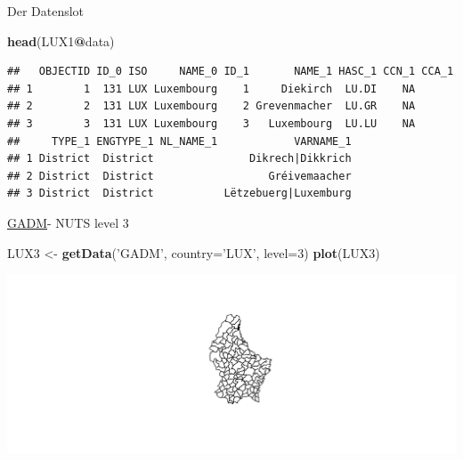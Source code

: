 \documentclass[ignorenonframetext,]{beamer}
\newenvironment{Shaded}{\begin{snugshade}}{\end{snugshade}}
\newcommand{\KeywordTok}[1]{\textcolor[rgb]{0.13,0.29,0.53}{\textbf{#1}}}
\newcommand{\DataTypeTok}[1]{\textcolor[rgb]{0.13,0.29,0.53}{#1}}
\newcommand{\DecValTok}[1]{\textcolor[rgb]{0.00,0.00,0.81}{#1}}
\newcommand{\StringTok}[1]{\textcolor[rgb]{0.31,0.60,0.02}{#1}}
\newcommand{\OperatorTok}[1]{\textcolor[rgb]{0.81,0.36,0.00}{\textbf{#1}}}
\newcommand{\NormalTok}[1]{#1}
\begin{document}
\begin{frame}[fragile]{Der Datenslot}

\begin{Shaded}
\begin{Highlighting}[]
\KeywordTok{head}\NormalTok{(LUX1}\OperatorTok{@}\NormalTok{data)}
\end{Highlighting}
\end{Shaded}

\begin{verbatim}
##   OBJECTID ID_0 ISO     NAME_0 ID_1       NAME_1 HASC_1 CCN_1 CCA_1
## 1        1  131 LUX Luxembourg    1     Diekirch  LU.DI    NA      
## 2        2  131 LUX Luxembourg    2 Grevenmacher  LU.GR    NA      
## 3        3  131 LUX Luxembourg    3   Luxembourg  LU.LU    NA      
##     TYPE_1 ENGTYPE_1 NL_NAME_1            VARNAME_1
## 1 District  District               Dikrech|Dikkrich
## 2 District  District                  Gréivemaacher
## 3 District  District           Lëtzebuerg|Luxemburg
\end{verbatim}

\end{frame}

\begin{frame}[fragile]{\href{http://www.gadm.org/}{GADM}- NUTS level 3}

\begin{Shaded}
\begin{Highlighting}[]
\NormalTok{LUX3 <-}\StringTok{ }\KeywordTok{getData}\NormalTok{(}\StringTok{'GADM'}\NormalTok{, }\DataTypeTok{country=}\StringTok{'LUX'}\NormalTok{, }\DataTypeTok{level=}\DecValTok{3}\NormalTok{)}
\KeywordTok{plot}\NormalTok{(LUX3)}
\end{Highlighting}
\end{Shaded}

\includegraphics{slides_all2gether_part1_files/figure-beamer/LUX3-1.pdf}

\end{frame}
\end{document}
